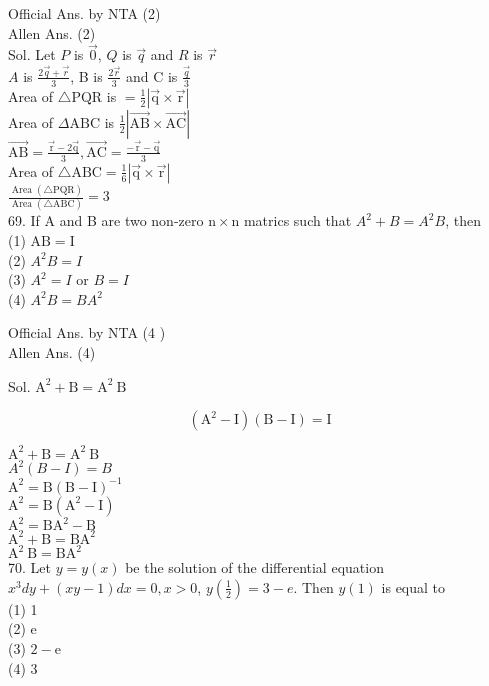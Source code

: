 \documentclass[10pt]{article}
\begin{document}
Official Ans. by NTA (2)\\
Allen Ans. (2)\\
Sol. Let \(P\) is \(\overrightarrow{0}\), \(Q\) is \(\vec{q}\) and \(R\) is \(\vec{r}\)\\
\(A\) is \(\frac{2 \vec{q}+\vec{r}}{3}\), B is \(\frac{2 \vec{r}}{3}\) and C is \(\frac{\vec{q}}{3}\)\\
Area of \(\triangle \mathrm{PQR}\) is \(=\frac{1}{2}|\overrightarrow{\mathrm{q}} \times \overrightarrow{\mathrm{r}}|\)\\
Area of \(\Delta \mathrm{ABC}\) is \(\frac{1}{2}|\overrightarrow{\mathrm{AB}} \times \overrightarrow{\mathrm{AC}}|\)\\
\(\overrightarrow{\mathrm{AB}}=\frac{\overrightarrow{\mathrm{r}}-2 \overrightarrow{\mathrm{q}}}{3}, \overrightarrow{\mathrm{AC}}=\frac{-\overrightarrow{\mathrm{r}}-\overrightarrow{\mathrm{q}}}{3}\)\\
Area of \(\triangle \mathrm{ABC}=\frac{1}{6}|\overrightarrow{\mathrm{q}} \times \overrightarrow{\mathrm{r}}|\)\\
\(\frac{\operatorname{Area}(\triangle \mathrm{PQR})}{\operatorname{Area}(\triangle \mathrm{ABC})}=3\)\\
69. If A and B are two non-zero \(\mathrm{n} \times \mathrm{n}\) matrics such that \(A^{2}+B=A^{2} B\), then\\
(1) \(\mathrm{AB}=\mathrm{I}\)\\
(2) \(A^{2} B=I\)\\
(3) \(A^{2}=I\) or \(B=I\)\\
(4) \(A^{2} B=B A^{2}\)

Official Ans. by NTA (4 )\\
Allen Ans. (4)

Sol. \(\mathrm{A}^{2}+\mathrm{B}=\mathrm{A}^{2} \mathrm{~B}\)

\[
\left(\mathrm{A}^{2}-\mathrm{I}\right)(\mathrm{B}-\mathrm{I})=\mathrm{I}
\]

\(\mathrm{A}^{2}+\mathrm{B}=\mathrm{A}^{2} \mathrm{~B}\)\\
\(A^{2}(B-I)=B\)\\
\(\mathrm{A}^{2}=\mathrm{B}(\mathrm{B}-\mathrm{I})^{-1}\)\\
\(\mathrm{A}^{2}=\mathrm{B}\left(\mathrm{A}^{2}-\mathrm{I}\right)\)\\
\(\mathrm{A}^{2}=\mathrm{BA}^{2}-\mathrm{B}\)\\
\(\mathrm{A}^{2}+\mathrm{B}=\mathrm{BA}^{2}\)\\
\(\mathrm{A}^{2} \mathrm{~B}=\mathrm{BA}^{2}\)\\
70. Let \(y=y(x)\) be the solution of the differential equation \(x^{3} d y+(x y-1) d x=0, x>0\), \(y\left(\frac{1}{2}\right)=3-e\). Then \(y(1)\) is equal to\\
(1) 1\\
(2) e\\
(3) \(2-\mathrm{e}\)\\
(4) 3
\end{document}
